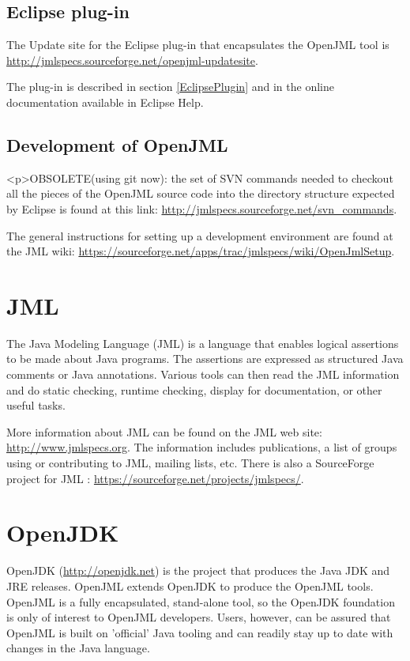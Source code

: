 \subsection{Eclipse plug-in}

The Update site for the Eclipse plug-in that encapsulates the OpenJML tool
is \url{http://jmlspecs.sourceforge.net/openjml-updatesite}.

The plug-in is described in section \ref{EclipsePlugin} and in the online documentation available in Eclipse Help.


\subsection{Development of OpenJML}
\label{Development}


<p>OBSOLETE(using git now): the set of SVN commands needed to checkout all the pieces of the
OpenJML source code into the directory structure expected by Eclipse is found at this link: 
\url{http://jmlspecs.sourceforge.net/svn_commands}.

The general instructions for setting up a development environment are found at the JML wiki: \url{https://sourceforge.net/apps/trac/jmlspecs/wiki/OpenJmlSetup}.



\section{JML}

The Java Modeling Language (JML) is a language that enables logical assertions
to be made about Java programs. The assertions are expressed as structured 
Java comments or Java annotations. Various tools can then read the JML 
information and do static checking, runtime checking, display for documentation,
or other useful tasks.

More information about JML can be found on the JML web site: 
\url{http://www.jmlspecs.org}.
The information includes publications, a list of groups using or contributing to JML, 
mailing lists, etc.
There is also a SourceForge project for JML : \url{https://sourceforge.net/projects/jmlspecs/}.

\section{OpenJDK}

OpenJDK (\url{http://openjdk.net}) is the project that produces the Java JDK and JRE releases.
OpenJML extends OpenJDK to produce the OpenJML tools. OpenJML is a 
fully encapsulated, stand-alone tool, so the OpenJDK foundation is only of interest to OpenJML developers.
Users, however, can be assured that OpenJML is built on 'official' Java tooling and can readily stay up 
to date with changes in the Java language.

